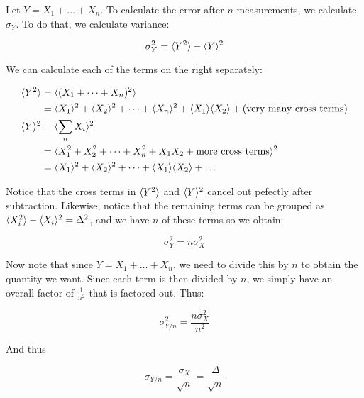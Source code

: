 \documentclass{article}
\begin{document}
\begin{solution}
    Let $Y = X_1 + \dots + X_n$. To calculate the error after $n$ measurements, we calculate $\sigma_Y$. To do that, we calculate variance:

    \[ \sigma_Y^2 = \langle Y^2 \rangle - \langle Y \rangle^2\]


    We can calculate each of the terms on the right separately:

    \begin{align*}
        \langle Y^2 \rangle &= \langle (X_1 + \dots + X_n)^2 \rangle\\
        &= \langle X_1 \rangle^2 + \langle X_2 \rangle^2 + \dots + \langle X_n \rangle^2 + \langle X_1 \rangle\langle X_2 \rangle + \text{(very many cross terms)}\\
        \langle Y \rangle^2 &= \langle \sum_n X_i \rangle^2\\
        &= \langle X_1^2 + X_2^2 + \dots + X_n^2 + X_1X_2 + \text{more cross terms} \rangle^2\\
        &= \langle X_1 \rangle^2 + \langle X_2 \rangle^2 + \dots + \langle X_1 \rangle\langle X_2 \rangle + \dots
    \end{align*}

    Notice that the cross terms in $\langle Y^2 \rangle$ and $\langle Y \rangle^2$ cancel out pefectly after subtraction. Likewise, notice that the remaining terms can be grouped as $\langle X_i^2 \rangle - \langle X_i \rangle^2 = \Delta^2$, and we have $n$ of these terms so we obtain:

    \[ \sigma_Y^2 = n \sigma_X^2\]

    Now note that since $Y = X_1 + \dots + X_n$, we need to divide this by $n$ to obtain the quantity we want. Since each term is then divided by $n$, we simply have an overall factor of $\frac{1}{n^2}$ that is factored out. Thus:

    \[ \sigma_{Y/n}^2 = \frac{n \sigma_X^2}{n^2}\]

    And thus

    \[ \sigma_{Y/n} = \frac{\sigma_X}{\sqrt{n}} = \frac{\Delta}{\sqrt{n}}\]









    
\end{solution}
\end{document}
